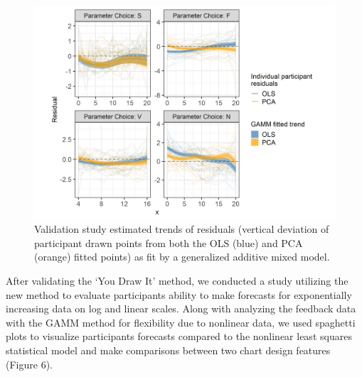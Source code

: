 \documentclass[10pt]{article}
\begin{document}
\begin{figure}[ht]
\begin{center}
\centerline{\includegraphics[width=\columnwidth]{images/eyefitting-gamm-plot}}
\caption{Validation study estimated trends of residuals (vertical deviation of participant drawn points from both the OLS (blue) and PCA (orange) fitted points) as fit by a generalized additive mixed model.}
\label{eyefitting-gamm-plot}
\end{center}
\end{figure}

After validating the `You Draw It' method, we conducted a study
utilizing the new method to evaluate participants ability to make
forecasts for exponentially increasing data on log and linear scales.
Along with analyzing the feedback data with the GAMM method for
flexibility due to nonlinear data, we used spaghetti plots to visualize
participants forecasts compared to the nonlinear least squares
statistical model and make comparisons between two chart design features
(Figure 6).
\end{document}
